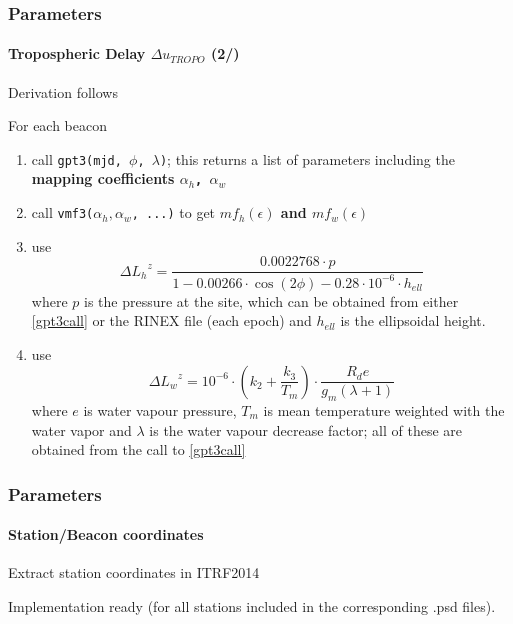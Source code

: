 \documentclass{beamer}
\begin{document}
\begin{frame}\frametitle{Parameters}\framesubtitle{Tropospheric Delay \(\Delta u_{TROPO}\) (2/)}
Derivation follows \cite{Landskron2018}

For each beacon
\begin{enumerate}[label=\textbf{T.\arabic*},ref=T.\arabic*]
  \item \label{gpt3call} call \texttt{gpt3(mjd, $\phi$, $\lambda$)}; this returns a list of parameters including the \textbf{mapping coefficients \texttt{$\alpha _h$, $\alpha _w$}}
  \item call \texttt{vmf3(\(\alpha _h, \alpha _w\), ...)} to get \textbf{\(mf_h(\epsilon)\) and \(mf_w(\epsilon)\)}
  \item use \begin{equation*}
    \Delta {L_{h}}^{z} = \frac{0.0022768 \cdot p}{1-0.00266 \cdot \cos(2\phi) - 0.28 \cdot 10^{-6} \cdot h_{ell}}
  \end{equation*}
  where $p$ is the pressure at the site, which can be obtained from either \ref{gpt3call} 
  or the RINEX file (each epoch) and $h_{ell}$ is the ellipsoidal height.
  \item use \begin{equation*}
    \Delta {L_{w}}^{z} = 10^{-6} \cdot ( k_2 + \frac{k_3}{T_m}) \cdot \frac{R_d e}{g_m (\lambda +1)}
  \end{equation*}
  where $e$ is water vapour pressure, $T_m$ is mean 
  temperature weighted with the water vapor and $\lambda$ is the water vapour 
  decrease factor; all of these are obtained from the call to \ref{gpt3call}
\end{enumerate}
\end{frame}

%    
%    
%

\begin{frame}\frametitle{Parameters}\framesubtitle{Station/Beacon coordinates}
    Extract station coordinates in ITRF2014\\
    \vspace{.3cm}

    Implementation ready (for all stations included in the corresponding .psd files).\\
    \vspace{.3cm}

\end{frame}
\end{document}

